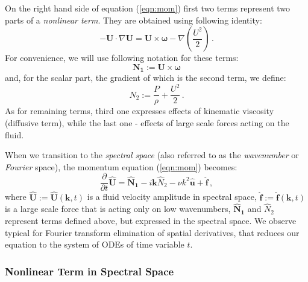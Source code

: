 \documentclass{pracamgren}
\begin{document}
On the right hand side of equation (\ref{eqn:mom}) first two terms represent two parts of a \emph{nonlinear term}. They are obtained using following identity:
$$ - \mathbf{U} \cdot \nabla \mathbf{U} = \mathbf{U} \times \boldsymbol{\omega} - \nabla (\frac{U^2}{2}) \, . $$
For convenience, we will use following notation for these terms:
$$ \mathbf{N_1} := \mathbf{U} \times \boldsymbol{\omega} $$
and, for the scalar part, the gradient of which is the second term, we define:
$$ N_2 := \frac{P}{\rho} + \frac{U^2}{2} \, . $$
As for remaining terms, third one expresses effects of kinematic viscosity (diffusive term), while the last one - effects of large scale forces acting on the fluid.

When we transition to the \emph{spectral space} (also referred to as the \emph{wavenumber} or \emph{Fourier} space), the momentum equation (\ref{eqn:mom}) becomes:
\begin{equation}
\label{eqn:mom-spec}
\frac{\partial}{\partial t} \mathbf{\hat{U}} = \mathbf{\hat{N}_1} - i \mathbf{k} \hat{N}_2 - \nu k^2 \mathbf{\hat{u}} + \mathbf{\hat{f}} \, ,
\end{equation}
where $\mathbf{\hat{U}} := \mathbf{\hat{U}}(\mathbf{k}, t)$ is a fluid velocity amplitude in spectral space, $\mathbf{\hat{f}} := \mathbf{\hat{f}}(\mathbf{k}, t)$ is a large scale force that is acting only on low wavenumbers, $\mathbf{\hat{N}_1}$ and $\hat{N}_2$ represent terms defined above, but expressed in the spectral space.
We observe typical for Fourier transform elimination of spatial derivatives, that reduces our equation to the system of ODEs of time variable $t$. 

\subsubsection{Nonlinear Term in Spectral Space}
\end{document}
